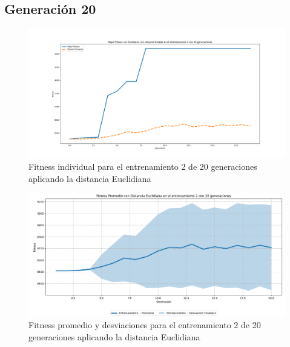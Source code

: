 \documentclass[lettersize, journal]{IEEEtran}
\begin{document}
\subsection{Generación 20}
\setcounter{figure}{0}
\renewcommand{\thefigure}{S\arabic{figure}C-E}


\begin{figure}[H]
    \centering
    \includegraphics[width=0.9 \linewidth]{Euclidiana/Fitness_individual_20/Fitness_2_Eucli_20Gen.png}
    \caption{Fitness individual para el entrenamiento 2 de 20 generaciones aplicando la distancia Euclidiana}
    \label{fig:eucli_2_20}
\end{figure}
\begin{figure}[H]
    \centering
    \includegraphics[width=0.9 \linewidth]{Euclidiana/Fitness_individual_20/Fitness_2_Eucli_20Gen_Sombra.png}
    \caption{Fitness promedio y desviaciones para el entrenamiento 2 de 20 generaciones aplicando la distancia Euclidiana}
    \label{fig:eucli_2_20_sombra}
\end{figure}
\end{document}
